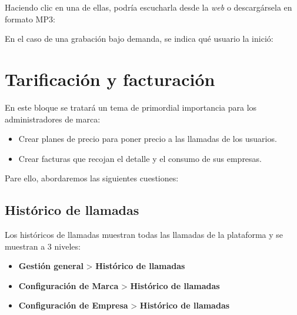 \documentclass[letterpaper,10pt,spanish]{sphinxmanual}
\begin{document}
\noindent{}

Haciendo clic en una de ellas, podría escucharla desde la \emph{web} o descargársela en formato MP3:

\noindent{}

En el caso de una grabación bajo demanda, se indica qué usuario la inició:

\noindent{}


\chapter{Tarificación y facturación}
\label{billing_and_invoices/index::doc}\label{billing_and_invoices/index:tarificacion-y-facturacion}
En este bloque se tratará un tema de primordial importancia para los administradores de marca:
\begin{itemize}
\item {} 
Crear planes de precio para poner precio a las llamadas de los usuarios.

\item {} 
Crear facturas que recojan el detalle y el consumo de sus empresas.

\end{itemize}

Pare ello, abordaremos las siguientes cuestiones:


\section{Histórico de llamadas}
\label{billing_and_invoices/call_registry:historico-de-llamadas}\label{billing_and_invoices/call_registry::doc}\label{billing_and_invoices/call_registry:call-registry}
Los históricos de llamadas muestran todas las llamadas de la plataforma y se muestran a 3 niveles:
\begin{itemize}
\item {} 
\textbf{Gestión general} \textgreater{} \textbf{Histórico de llamadas}

\item {} 
\textbf{Configuración de Marca} \textgreater{} \textbf{Histórico de llamadas}

\item {} 
\textbf{Configuración de Empresa} \textgreater{} \textbf{Histórico de llamadas}

\end{itemize}
\end{document}
